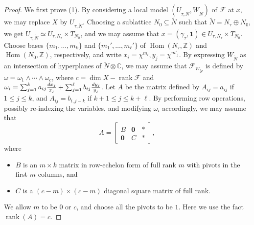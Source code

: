 \documentclass[12pt,reqno]{amsart}
\theoremstyle{definition}
\newcommand{\on}{\operatorname}
\newcommand\cF{{\mathcal{F}}}
\newcommand\bC{{\mathbb C}}
\newcommand\bZ{{\mathbb Z}}
\newcommand{\diff}{\textnormal{d}}
\begin{document}
\begin{proof}
    We first prove (1). By considering a local model $(U_{\tau,\widetilde N},W_{\widetilde N})$ of $\cF$ at $x$, we may replace $X$ by $U_{\tau,\widetilde N}$. Choosing a sublattice $N_0\subseteq \widetilde N$ such that $\widetilde N=N_\tau\oplus N_0$, we get $U_{\tau,\widetilde N}\simeq U_{\tau,N_\tau}\times T_{N_0}$, and we may assume that $x=(\gamma_\tau,\mathbf 1)\in U_{\tau,N_\tau}\times T_{N_0}$. Choose bases $\{m_1,\ldots,m_k\}$ and $\{m_1',\ldots,m_\ell'\}$ of $\on{Hom} (N_\tau,\bZ)$ and $\on{Hom} (N_0,\bZ)$, respectively, and write $x_i=\chi^{m_i},y_j=\chi^{m'_j}$. By expressing $W_{\widetilde N}$ as an intersection of hyperplanes of $\widetilde N\otimes\bC$, we may assume that $\cF_{W_{\widetilde N}}$ is defined by $\omega=\omega_1\wedge\cdots\wedge\omega_c$, where $c=\dim X-\on{rank}\cF$ and $\omega_i=\sum_{j=1}^ka_{ij}\frac{\diff x_j}{x_j}+\sum_{j=1}^{\ell}b_{ij}\frac{\diff y_{j}}{y_{j}}$. Let $A$ be the matrix defined by $A_{ij}=a_{ij}$ if $1\leq j\leq k$, and $A_{ij}=b_{i,j-k}$ if $k+1\leq j\leq k+\ell$. By performing row operations, possibly re-indexing the variables, and modifying $\omega_i$ accordingly, we may assume that  
    \begin{equation}\tag{*}
        A =
        \begin{bmatrix}
        B & \textbf{0} & *\\
        \mathbf{0} & C & *
        \end{bmatrix},
    \end{equation}
    where
    \begin{itemize}
        \item  $B$ is an $ m \times k $ matrix in row-echelon form of full rank $m$ with pivots in the first $m$ columns, and
        \item  $C$ is a $(c-m) \times (c-m)$ diagonal square matrix of full rank.
    \end{itemize} 
    We allow $m$ to be $0$ or $c$, and choose all the pivots to be $1$.
    Here we use the fact $\on{rank}(A)=c$.
    

\end{proof}
\end{document}
